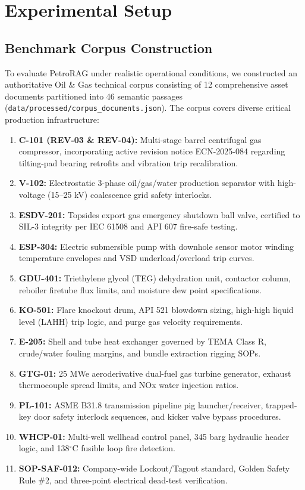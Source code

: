 \section{Experimental Setup}
\label{sec:experimental_setup}

\subsection{Benchmark Corpus Construction}
To evaluate PetroRAG under realistic operational conditions, we constructed an authoritative Oil \& Gas technical corpus consisting of 12 comprehensive asset documents partitioned into 46 semantic passages (\texttt{data/processed/corpus_documents.json}). The corpus covers diverse critical production infrastructure:
\begin{enumerate}
    \item \textbf{C-101 (REV-03 \& REV-04):} Multi-stage barrel centrifugal gas compressor, incorporating active revision notice ECN-2025-084 regarding tilting-pad bearing retrofits and vibration trip recalibration.
    \item \textbf{V-102:} Electrostatic 3-phase oil/gas/water production separator with high-voltage (15--25 kV) coalescence grid safety interlocks.
    \item \textbf{ESDV-201:} Topsides export gas emergency shutdown ball valve, certified to SIL-3 integrity per IEC 61508 and API 607 fire-safe testing.
    \item \textbf{ESP-304:} Electric submersible pump with downhole sensor motor winding temperature envelopes and VSD underload/overload trip curves.
    \item \textbf{GDU-401:} Triethylene glycol (TEG) dehydration unit, contactor column, reboiler firetube flux limits, and moisture dew point specifications.
    \item \textbf{KO-501:} Flare knockout drum, API 521 blowdown sizing, high-high liquid level (LAHH) trip logic, and purge gas velocity requirements.
    \item \textbf{E-205:} Shell and tube heat exchanger governed by TEMA Class R, crude/water fouling margins, and bundle extraction rigging SOPs.
    \item \textbf{GTG-01:} 25 MWe aeroderivative dual-fuel gas turbine generator, exhaust thermocouple spread limits, and NOx water injection ratios.
    \item \textbf{PL-101:} ASME B31.8 transmission pipeline pig launcher/receiver, trapped-key door safety interlock sequences, and kicker valve bypass procedures.
    \item \textbf{WHCP-01:} Multi-well wellhead control panel, 345 barg hydraulic header logic, and 138$^\circ$C fusible loop fire detection.
    \item \textbf{SOP-SAF-012:} Company-wide Lockout/Tagout standard, Golden Safety Rule \#2, and three-point electrical dead-test verification.
\end{enumerate}

